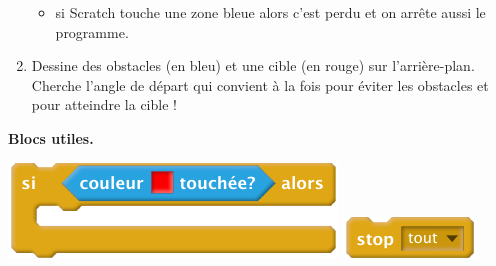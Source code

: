 \documentclass[class=report,crop=false, 12pt]{standalone}
\begin{document}
\begin{activite}
\begin{enumerate}
\begin{itemize}
    \item si Scratch touche une zone bleue alors c'est perdu et on arrête aussi le programme.
  \end{itemize}
   
  \item Dessine des obstacles (en bleu) et une cible (en rouge) sur l'arrière-plan. Cherche l'angle de départ qui convient à la fois pour éviter les obstacles et pour atteindre la cible !
\end{enumerate}



\textbf{Blocs utiles.}
\begin{center}
  \includegraphics[scale=\scalebloc]{bloc-04-ex1a}  \qquad
  \includegraphics[scale=\scalebloc]{bloc-04-ex1b}   
\end{center}


\end{activite}
\end{document}
